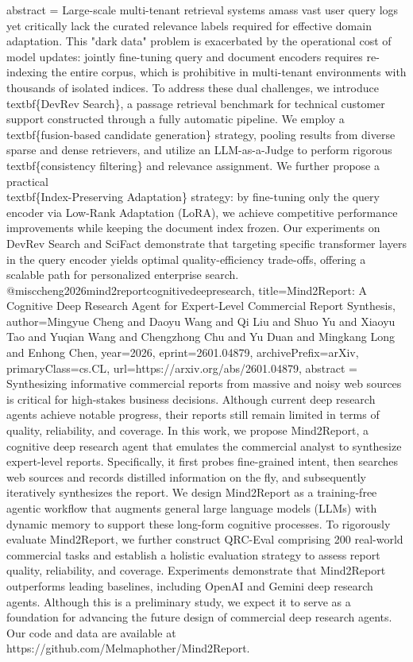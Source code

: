 {      abstract = {Large-scale multi-tenant retrieval systems amass vast user query logs yet critically lack the curated relevance labels required for effective domain adaptation. This "dark data" problem is exacerbated by the operational cost of model updates: jointly fine-tuning query and document encoders requires re-indexing the entire corpus, which is prohibitive in multi-tenant environments with thousands of isolated indices. To address these dual challenges, we introduce \\textbf\{DevRev Search\}, a passage retrieval benchmark for technical customer support constructed through a fully automatic pipeline. We employ a \\textbf\{fusion-based candidate generation\} strategy, pooling results from diverse sparse and dense retrievers, and utilize an LLM-as-a-Judge to perform rigorous \\textbf\{consistency filtering\} and relevance assignment. We further propose a practical \\textbf\{Index-Preserving Adaptation\} strategy: by fine-tuning only the query encoder via Low-Rank Adaptation (LoRA), we achieve competitive performance improvements while keeping the document index frozen. Our experiments on DevRev Search and SciFact demonstrate that targeting specific transformer layers in the query encoder yields optimal quality-efficiency trade-offs, offering a scalable path for personalized enterprise search.}
}@misc{cheng2026mind2reportcognitivedeepresearch,
      title={Mind2Report: A Cognitive Deep Research Agent for Expert-Level Commercial Report Synthesis}, 
      author={Mingyue Cheng and Daoyu Wang and Qi Liu and Shuo Yu and Xiaoyu Tao and Yuqian Wang and Chengzhong Chu and Yu Duan and Mingkang Long and Enhong Chen},
      year={2026},
      eprint={2601.04879},
      archivePrefix={arXiv},
      primaryClass={cs.CL},
      url={https://arxiv.org/abs/2601.04879},
      abstract = {Synthesizing informative commercial reports from massive and noisy web sources is critical for high-stakes business decisions. Although current deep research agents achieve notable progress, their reports still remain limited in terms of quality, reliability, and coverage. In this work, we propose Mind2Report, a cognitive deep research agent that emulates the commercial analyst to synthesize expert-level reports. Specifically, it first probes fine-grained intent, then searches web sources and records distilled information on the fly, and subsequently iteratively synthesizes the report. We design Mind2Report as a training-free agentic workflow that augments general large language models (LLMs) with dynamic memory to support these long-form cognitive processes. To rigorously evaluate Mind2Report, we further construct QRC-Eval comprising 200 real-world commercial tasks and establish a holistic evaluation strategy to assess report quality, reliability, and coverage. Experiments demonstrate that Mind2Report outperforms leading baselines, including OpenAI and Gemini deep research agents. Although this is a preliminary study, we expect it to serve as a foundation for advancing the future design of commercial deep research agents. Our code and data are available at https://github.com/Melmaphother/Mind2Report.}
}
